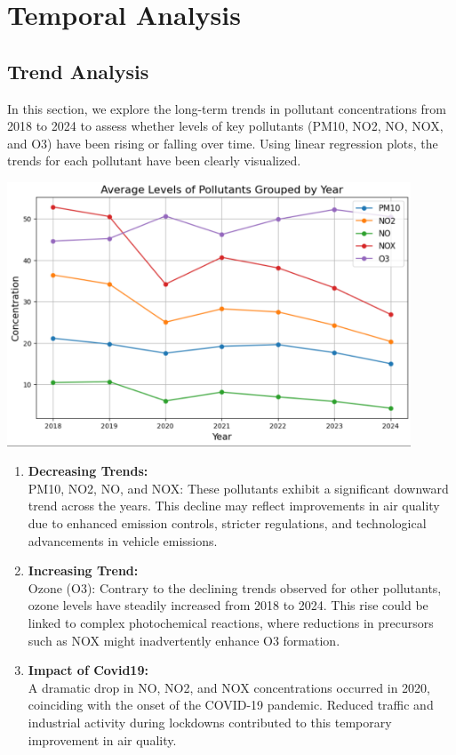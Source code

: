 \documentclass{modeleRapport}
\begin{document}
\newpage
\section{Temporal Analysis}

\subsection{Trend Analysis}

In this section, we explore the long-term trends in pollutant concentrations from 2018 to 2024 to assess whether levels 
of key pollutants (PM10, NO2, NO, NOX, and O3) have been rising or falling over time. Using linear regression plots, 
the trends for each pollutant have been clearly visualized.\\

\begin{center}
    \includegraphics[width=12cm]{Images/PollutantsPerYear.png}
\end{center}

\begin{enumerate}
    \item \textbf{Decreasing Trends: }\\
    PM10, NO2, NO, and NOX: These pollutants exhibit a significant downward trend across the years. 
    This decline may reflect improvements in air quality due to enhanced emission controls, stricter regulations, 
    and technological advancements in vehicle emissions.\\
    \item \textbf{Increasing Trend:}\\
    Ozone (O3): Contrary to the declining trends observed for other pollutants, ozone levels have steadily increased 
    from 2018 to 2024. This rise could be linked to complex photochemical reactions, where reductions in precursors 
    such as NOX might inadvertently enhance O3 formation.\\
    \item \textbf{Impact of Covid19:}\\
    A dramatic drop in NO, NO2, and NOX concentrations occurred in 2020, coinciding with the onset of the COVID-19 pandemic. 
    Reduced traffic and industrial activity during lockdowns contributed to this temporary improvement in air quality.\\
\end{enumerate}
\end{document}
